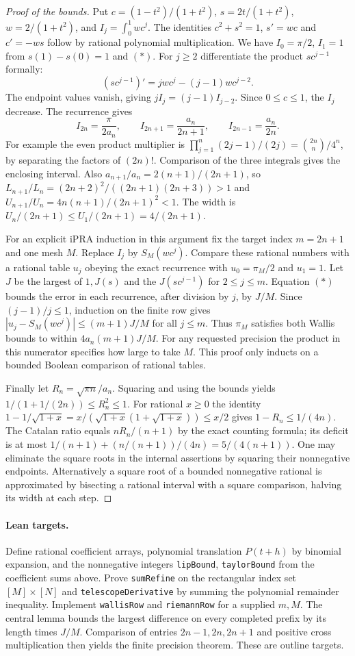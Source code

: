 \begin{proof}[Proof of the bounds]
Put $c=(1-t^2)/(1+t^2)$, $s=2t/(1+t^2)$, $w=2/(1+t^2)$, and
$I_j=\int_0^1 wc^j$. The identities $c^2+s^2=1$, $s'=wc$ and
$c'=-ws$ follow by rational polynomial multiplication. We have
$I_0=\pi/2$, $I_1=1$ from $s(1)-s(0)=1$ and $(*)$. For $j\ge2$
differentiate the product $sc^{j-1}$ formally:
\[
 (sc^{j-1})'=jwc^j-(j-1)wc^{j-2}.
\]
The endpoint values vanish, giving $j I_j=(j-1)I_{j-2}$. Since
$0\le c\le1$, the $I_j$ decrease. The recurrence gives
\[
 I_{2n}=\frac{\pi}{2a_n},\qquad
 I_{2n+1}=\frac{a_n}{2n+1},\qquad I_{2n-1}=\frac{a_n}{2n}.
\]
For example the even product multiplier is
$\prod_{j=1}^n(2j-1)/(2j)=\binom{2n}{n}/4^n$, by separating the
factors of $(2n)!$. Comparison of the three integrals gives the enclosing
interval. Also $a_{n+1}/a_n=2(n+1)/(2n+1)$, so
$L_{n+1}/L_n=(2n+2)^2/((2n+1)(2n+3))>1$ and
$U_{n+1}/U_n=4n(n+1)/(2n+1)^2<1$. The width is
$U_n/(2n+1)\le U_1/(2n+1)=4/(2n+1)$.

For an explicit iPRA induction in this argument fix the target index
$m=2n+1$ and one mesh $M$. Replace $I_j$ by $S_M(wc^j)$.
Compare these rational numbers with a rational table $u_j$ obeying the
exact recurrence with $u_0=\pi_M/2$ and $u_1=1$. Let $J$ be the largest
of $1,J(s)$ and the $J(sc^{j-1})$ for $2\le j\le m$.
Equation $(*)$ bounds the error in each recurrence, after division by
$j$, by $J/M$. Since $(j-1)/j\le1$, induction on the finite row
gives $|u_j-S_M(wc^j)|\le(m+1)J/M$ for all $j\le m$.
Thus $\pi_M$ satisfies both Wallis bounds to within
$4a_n(m+1)J/M$. For any requested precision the product in this numerator
specifies how large to take $M$. This proof only inducts on a bounded
Boolean comparison of rational tables.

Finally let $R_n=\sqrt{\pi n}/a_n$. Squaring and using the bounds yields
$1/(1+1/(2n))\le R_n^2\le1$.
For rational $x\ge0$ the identity
$1-1/\sqrt{1+x}=x/(\sqrt{1+x}(1+\sqrt{1+x}))\le x/2$
gives $1-R_n\le1/(4n)$. The Catalan ratio equals
$nR_n/(n+1)$ by the exact counting formula; its deficit is at most
$1/(n+1)+(n/(n+1))/(4n)=5/(4(n+1))$.
One may eliminate the square roots in the internal assertions by squaring
their nonnegative endpoints. Alternatively a square root of a bounded
nonnegative rational is approximated by bisecting a rational interval
with a square comparison, halving its width at each step.
\end{proof}

\paragraph{Lean targets.}
Define rational coefficient arrays, polynomial translation
$P(t+h)$ by binomial expansion, and the nonnegative integers
\texttt{lipBound}, \texttt{taylorBound} from the coefficient sums above.
Prove \texttt{sumRefine} on the rectangular index set $[M]\times[N]$
and \texttt{telescopeDerivative} by summing the polynomial remainder
inequality. Implement \texttt{wallisRow} and \texttt{riemannRow} for a
supplied $m,M$. The central lemma bounds the largest difference on every
completed prefix by its length times $J/M$. Comparison of entries
$2n-1,2n,2n+1$ and positive cross multiplication then yields the
finite precision theorem. These are outline targets.
